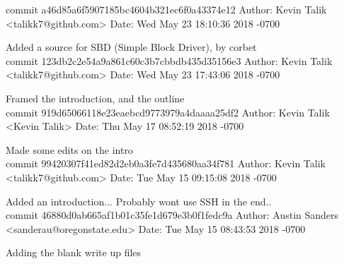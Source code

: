 \documentclass[onecolumn, draftclsnofoot,10pt, compsoc]{IEEEtran}
\begin{document}
{commit a46d85a6f5907185bc4604b321ec6f0a43374e12
Author: Kevin Talik <talikk7@github.com>
Date:   Wed May 23 18:10:36 2018 -0700

    Added a source for SBD (Simple Block Driver), by corbet\\

commit 123db2c2e54a9a861c60c3b7cbbdb435d35156e3
Author: Kevin Talik <talikk7@github.com>
Date:   Wed May 23 17:43:06 2018 -0700

    Framed the introduction, and the outline\\

commit 919d65066118e23eaebcd9773979a4daaaa25df2
Author: Kevin Talik <Kevin Talik>
Date:   Thu May 17 08:52:19 2018 -0700

    Made some edits on the intro\\

commit 99420307f41ed82d2eb0a3fe7d435680aa34f781
Author: Kevin Talik <talikk7@github.com>
Date:   Tue May 15 09:15:08 2018 -0700

    Added an introduction... Probably wont use SSH in the end..\\

commit 46880d0ab665af1b01c35fe1d679e3b0f1fedc9a
Author: Austin Sanders <sanderau@oregonstate.edu>
Date:   Tue May 15 08:43:53 2018 -0700

    Adding the blank write up files\\
}
    
        
\end{document}
